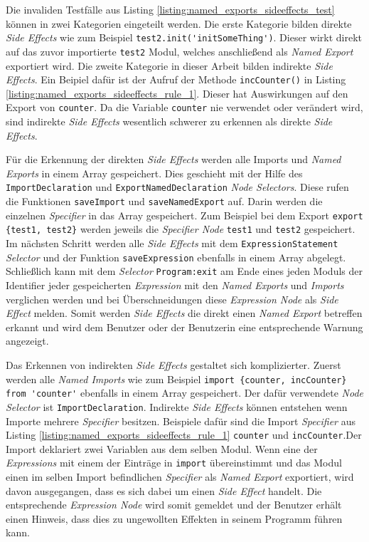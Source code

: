 Die invaliden Testfälle aus Listing \ref{listing:named_exports_sideeffects_test} können in zwei Kategorien eingeteilt werden. Die erste Kategorie bilden direkte \textit{Side Effects} wie zum Beispiel \lstinline{test2.init('initSomeThing')}. Dieser wirkt direkt auf das zuvor importierte \lstinline{test2} Modul, welches anschließend als \textit{Named Export} exportiert wird. Die zweite Kategorie in dieser Arbeit bilden indirekte \textit{Side Effects}. Ein Beipiel dafür ist der Aufruf der Methode \lstinline{incCounter()} in Listing \ref{listing:named_exports_sideeffects_rule_1}. Dieser hat Auswirkungen auf den Export von \lstinline{counter}. Da die Variable \lstinline{counter} nie verwendet oder verändert wird, sind indirekte \textit{Side Effects} wesentlich schwerer zu erkennen als direkte \textit{Side Effects}. 

Für die Erkennung der direkten \textit{Side Effects} werden alle Imports und \textit{Named Exports} in einem Array gespeichert. Dies geschieht mit der Hilfe des \lstinline{ImportDeclaration} und \lstinline{ExportNamedDeclaration} \textit{Node Selectors}. Diese rufen die Funktionen \lstinline{saveImport}  und \lstinline{saveNamedExport} auf. Darin werden die einzelnen \textit{Specifier} in das Array gespeichert. Zum Beispiel bei dem Export \lstinline|export {test1, test2}| werden jeweils die \textit{Specifier Node} \lstinline{test1} und \lstinline{test2} gespeichert. Im nächsten Schritt werden alle \textit{Side Effects} mit dem \lstinline{ExpressionStatement} \textit{Selector} und der Funktion \lstinline{saveExpression} ebenfalls in einem Array abgelegt. Schließlich kann mit dem \textit{Selector} \lstinline{Program:exit} am Ende eines jeden Moduls der Identifier jeder gespeicherten \textit{Expression} mit den \textit{Named Exports} und \textit{Imports} verglichen werden und bei Überschneidungen diese \textit{Expression Node} als \textit{Side Effect} melden.
Somit werden \textit{Side Effects} die direkt einen \textit{Named Export} betreffen erkannt und wird dem Benutzer oder der Benutzerin eine entsprechende Warnung  angezeigt.

Das Erkennen von indirekten \textit{Side Effects} gestaltet sich komplizierter. Zuerst werden alle \textit{Named Imports} wie zum Beispiel \lstinline|import {counter, incCounter} from 'counter'| ebenfalls in einem Array gespeichert. Der dafür verwendete \textit{Node Selector} ist \lstinline{ImportDeclaration}. 
Indirekte \textit{Side Effects} können entstehen wenn Importe mehrere \textit{Specifier} besitzen. Beispiele dafür sind die Import \textit{Specifier} aus Listing \ref{listing:named_exports_sideeffects_rule_1} \lstinline{counter} und \lstinline{incCounter}.Der Import deklariert zwei Variablen aus dem selben Modul. Wenn eine der \textit{Expressions} mit einem der Einträge in \lstinline{import} übereinstimmt und das Modul einen im selben Import befindlichen \textit{Specifier} als \textit{Named Export} exportiert, wird davon ausgegangen, dass es sich dabei um einen \textit{Side Effect} handelt. Die entsprechende \textit{Expression Node} wird somit gemeldet und der Benutzer erhält einen Hinweis, dass dies zu ungewollten Effekten in seinem Programm führen kann.

